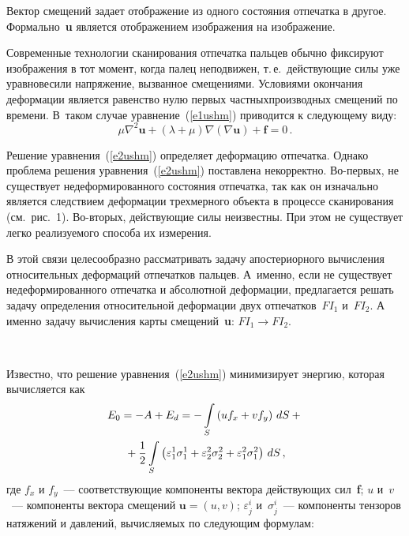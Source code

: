 \begin{multicols}{2}
      Вектор смещений задает отображение из одного состояния отпечатка в другое. 
Формально~\textbf{u} является отображением изображения на изображение.
      
      Современные технологии сканирования отпечатка пальцев обычно фиксируют 
изображения в тот момент, когда палец неподвижен, т.\,е.\ действующие силы уже 
уравновесили напряжение, вызванное смещениями. Условиями окончания деформации 
является равенство нулю первых частных\linebreak производных смещений по времени. В~таком 
случае уравнение~(\ref{e1ushm}) приводится к следующему виду:
      \begin{equation}
      \mu\nabla^2\mathbf{u}+\left(\lambda+\mu\right)\nabla 
\left(\nabla\mathbf{u}\right)+\mathbf{f}=0\,.
      \label{e2ushm}
      \end{equation}
      
      Решение уравнения~(\ref{e2ushm}) определяет деформацию отпечатка. Однако 
проблема решения уравнения~(\ref{e2ushm}) поставлена некорректно. Во-первых, не 
существует недеформированного состояния отпечатка, так как он изначально является 
следствием деформации трехмерного объекта в процессе сканирования 
(см.\ рис.~1). Во-вторых, действующие силы неизвестны. При этом не существует 
легко реализуемого способа их измерения. 
      
      В этой связи целесообразно рассматривать задачу апостериорного вычисления 
относительных деформаций отпечатков пальцев. А~именно, если не существует 
недеформированного отпечатка и абсолютной деформации, предлагается решать задачу 
определения относительной деформации двух отпечатков~$FI_1$ и~$FI_2$. А именно 
задачу вычисления карты смещений~\textbf{u}: $FI_1\rightarrow FI_2$.

\begin{figure*} %
\vspace*{1pt}
\begin{center}
\mbox{%
\epsfxsize=125.086mm
}
\end{center}
\vspace*{-9pt}
\vspace*{12pt}
\end{figure*}
      
      Известно, что решение уравнения~(\ref{e2ushm}) минимизирует энергию, которая 
вычисляется как
      \begin{multline}
      E_0=-A+E_d=-\int\limits_S \left ( uf_x+vf_y\right )\,dS+{}\\
      {}+\displaystyle\frac{\displaystyle 1\mathstrut}{\displaystyle 2\mathstrut}\int\limits_S \left ( 
\varepsilon_1^1\sigma_1^1+\varepsilon_2^2\sigma_2^2+\varepsilon_1^2\sigma_1^2\right )\,dS\,,
      \label{e3ushm}
      \end{multline}
где $f_x$ и $f_y$~--- соответствующие компоненты вектора действующих сил~\textbf{f}; 
$u$ и~$v$~--- компоненты вектора смещений $\mathbf{u} =(u,v)$; $\varepsilon_j^i$ 
и~$\sigma_j^i$~--- компоненты тензоров натяжений и давлений, вычисляемых по 
следующим формулам:
\pagebreak


\end{multicols}
